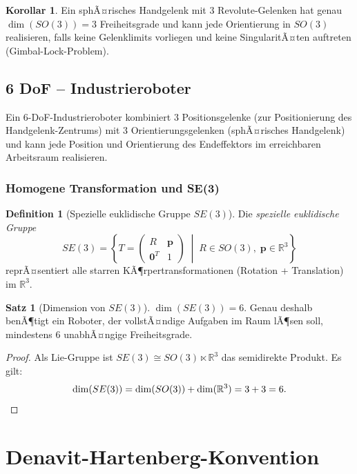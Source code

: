 ﻿\documentclass[a4paper,12pt]{article}
\theoremstyle{definition}
\newtheorem{definition}{Definition}
\newtheorem{satz}{Satz}
\newtheorem{korollar}{Korollar}
\begin{document}
\begin{korollar}
	Ein sphÃ¤risches Handgelenk mit 3 Revolute-Gelenken hat genau $\dim(SO(3)) = 3$ Freiheitsgrade und kann jede Orientierung in $SO(3)$ realisieren, falls keine Gelenklimits vorliegen und keine SingularitÃ¤ten auftreten (Gimbal-Lock-Problem).
\end{korollar}

\subsection{6 DoF -- Industrieroboter}

Ein 6-DoF-Industrieroboter kombiniert 3 Positionsgelenke (zur Positionierung des Handgelenk-Zentrums) mit 3 Orientierungsgelenken (sphÃ¤risches Handgelenk) und kann jede Position und Orientierung des Endeffektors im erreichbaren Arbeitsraum realisieren.

\subsubsection{Homogene Transformation und SE(3)}

\begin{definition}[Spezielle euklidische Gruppe $SE(3)$]
	Die \emph{spezielle euklidische Gruppe}
	\[
		SE(3) = \left\{ T = \begin{pmatrix} R & \mathbf{p} \\ \mathbf{0}^T & 1 \end{pmatrix} \;\middle|\; R \in SO(3),\; \mathbf{p} \in \mathbb{R}^3 \right\}
	\]
	reprÃ¤sentiert alle starren KÃ¶rpertransformationen (Rotation + Translation) im $\mathbb{R}^3$.
\end{definition}

\begin{satz}[Dimension von $SE(3)$]
\label{satz:se3dim}
	$\dim(SE(3)) = 6$. Genau deshalb benÃ¶tigt ein Roboter, der vollstÃ¤ndige Aufgaben im Raum lÃ¶sen soll, mindestens 6 unabhÃ¤ngige Freiheitsgrade.
\end{satz}

\begin{proof}
	Als Lie-Gruppe ist $SE(3) \cong SO(3) \ltimes \mathbb{R}^3$ das semidirekte Produkt. Es gilt:
	\[
		\dim(SE(3)) = \dim(SO(3)) + \dim(\mathbb{R}^3) = 3 + 3 = 6. \qedhere
	\]
\end{proof}

\section{Denavit-Hartenberg-Konvention}
\end{document}
